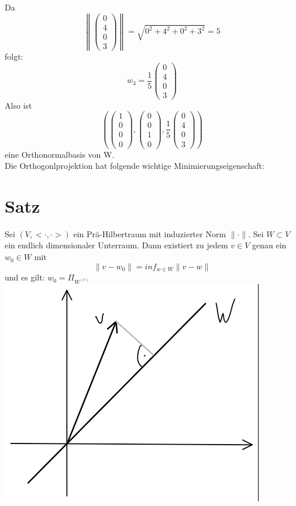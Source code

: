 \documentclass{scrbook}
\begin{document}
Da
\[\left\| \left(
\begin{array}{c}
0\\4\\0\\3
\end{array}
\right)\right\| = \sqrt{0^2+4^2+0^2+3^2} =5\]
folgt:
\[
w_3 = \frac{1}{5} \left(
\begin{array}{c}
0\\4\\0\\3
\end{array}
\right)
\]
Also ist
\[\left(
\left(
\begin{array}{c}
1\\0\\0\\0
\end{array}
\right),\left(
\begin{array}{c}
0\\0\\1\\0
\end{array}
\right),
\frac{1}{5}\left(
\begin{array}{c}
0\\4\\0\\3
\end{array}
\right)
\right)\]
eine Orthonormalbasis von W.\\
Die Orthogonlprojektion hat folgende wichtige Minimierungseigenschaft:
\section{Satz}
Sei $(V,<\cdot , \cdot >)$ ein Prä-Hilbertraum mit induzierter Norm $\| \cdot \|$. Sei $W \subset V$ ein endlich dimensionaler Unterraum. Dann existiert zu jedem $v \in V$ genau ein $w_0 \in W$ mit 
\[
\|v-w_0\| = inf _{w\in W} \|v-w\|
\]
und es gilt: $w_0 = \Pi_{W^{(v)}}$
\\\includegraphics{Graph6.png}
\\
\end{document}
